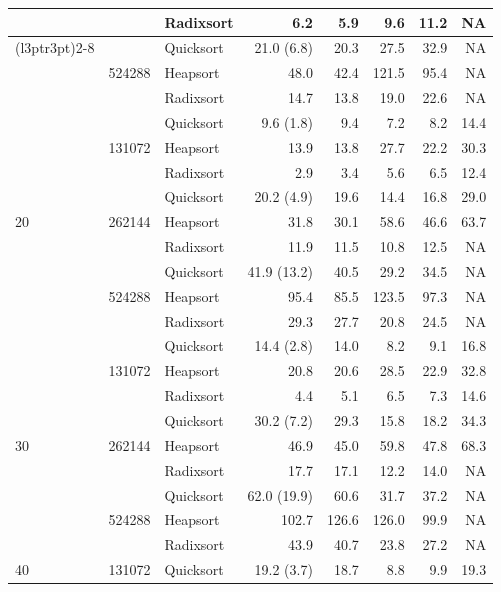 \begin{table}[!t]
{\begin{tabular}{lllrrrrr}
     &  & Radixsort & 6.2 & 5.9 & 9.6 & 11.2 & NA \\
\cmidrule(l{3pt}r{3pt}){2-8}
     & \multirow{3}{*}{524288} & Quicksort & 21.0 (6.8) & 20.3 & 27.5 & 32.9 & NA \\
     &  & Heapsort  & 48.0 & 42.4 & 121.5 & 95.4 & NA \\
     &  & Radixsort & 14.7 & 13.8 & 19.0 & 22.6 & NA \\
\midrule
    \multirow{9}{*}{20} & \multirow{3}{*}{131072} & Quicksort & 9.6 (1.8) & 9.4 & 7.2 & 8.2 & 14.4 \\
     &  & Heapsort  & 13.9 & 13.8 & 27.7 & 22.2 & 30.3 \\
     &  & Radixsort & 2.9 & 3.4 & 5.6 & 6.5 & 12.4 \\
\cmidrule(l{3pt}r{3pt}){2-8}
     & \multirow{3}{*}{262144} & Quicksort & 20.2 (4.9) & 19.6 & 14.4 & 16.8 & 29.0 \\
     &  & Heapsort  & 31.8 & 30.1 & 58.6 & 46.6 & 63.7 \\
     &  & Radixsort & 11.9 & 11.5 & 10.8 & 12.5 & NA \\
\cmidrule(l{3pt}r{3pt}){2-8}
     & \multirow{3}{*}{524288} & Quicksort & 41.9 (13.2) & 40.5 & 29.2 & 34.5 & NA \\
     &  & Heapsort  & 95.4 & 85.5 & 123.5 & 97.3 & NA \\
     &  & Radixsort & 29.3 & 27.7 & 20.8 & 24.5 & NA \\
\midrule
    \multirow{9}{*}{30} & \multirow{3}{*}{131072} & Quicksort & 14.4 (2.8) & 14.0 & 8.2 & 9.1 & 16.8 \\
     &  & Heapsort  & 20.8 & 20.6 & 28.5 & 22.9 & 32.8 \\
     &  & Radixsort & 4.4 & 5.1 & 6.5 & 7.3 & 14.6 \\
\cmidrule(l{3pt}r{3pt}){2-8}
     & \multirow{3}{*}{262144} & Quicksort & 30.2 (7.2) & 29.3 & 15.8 & 18.2 & 34.3 \\
     &  & Heapsort  & 46.9 & 45.0 & 59.8 & 47.8 & 68.3 \\
     &  & Radixsort & 17.7 & 17.1 & 12.2 & 14.0 & NA \\
\cmidrule(l{3pt}r{3pt}){2-8}
     & \multirow{3}{*}{524288} & Quicksort & 62.0 (19.9) & 60.6 & 31.7 & 37.2 & NA \\
     &  & Heapsort  & 102.7 & 126.6 & 126.0 & 99.9 & NA \\
     &  & Radixsort & 43.9 & 40.7 & 23.8 & 27.2 & NA \\
\midrule
    \multirow{9}{*}{40} & \multirow{3}{*}{131072} & Quicksort & 19.2 (3.7) & 18.7 & 8.8 & 9.9 & 19.3 \\

\end{tabular}}
\end{table}

